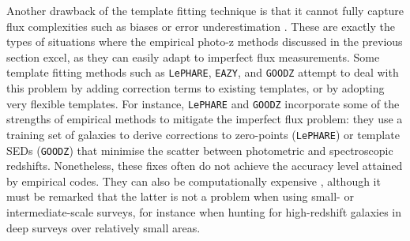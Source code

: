 Another drawback of the template fitting technique is that it cannot fully capture flux complexities such as biases or error underestimation \citep{2010MNRAS.405..987B,2017ApJ...838....5L}. These are exactly the types of situations where the empirical photo-z methods discussed in the previous section excel, as they can easily adapt to imperfect flux measurements. Some template fitting methods such as  \texttt{LePHARE}, \texttt{EAZY}, and \texttt{GOODZ} \citep{2010ApJ...724..425D} attempt to deal with this problem by adding correction terms to existing templates, or by adopting very flexible templates. For instance,  \texttt{LePHARE} and \texttt{GOODZ} incorporate some of the strengths of empirical methods to mitigate the imperfect flux problem: they use a training set of galaxies to derive corrections to  zero-points (\texttt{LePHARE}) or template SEDs (\texttt{GOODZ}) that minimise the scatter between photometric and spectroscopic redshifts. Nonetheless, these fixes often do not achieve the accuracy level attained by empirical codes. They can also be computationally expensive \citep{2017ApJ...838....5L}, although it must be remarked that the latter is not a problem when using small- or intermediate-scale surveys, for instance when hunting for high-redshift galaxies in deep surveys over relatively small areas. \par

